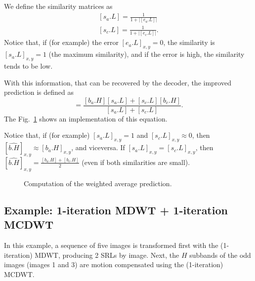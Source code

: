 We define the similarity matrices as
\begin{equation}
  \begin{array}{l}
    {[s_a.L]} = \frac{1}{1+{|[e_a.L]|}}\\
    {[s_c.L]} = \frac{1}{1+{|[e_c.L]|}}.    
  \end{array}
  \label{eq:weighted_prediction}
\end{equation}
Notice that, if (for example) the error $[e_a.L]_{x,y}=0$, the
similarity is $[s_a.L]_{x,y}=1$ (the maximum similarity), and if the
error is high, the similarity tends to be low.

With this information, that can be recovered by the decoder, the
improved prediction is defined as
\begin{equation}
  [\hat{b.H}] = \frac{[b_a.H][s_a.L]+[s_c.L][b_c.H]}{[s_a.L]+[s_c.L]}.
\end{equation}
The Fig.~\ref{fig:weighted_average} shows an implementation of this
equation.

Notice that, if (for example) $[s_a.L]_{x,y}=1$ and
$[s_c.L]_{x,y}\approx 0$, then
$[\hat{b.H}]_{x,y}\approx [b_a.H]_{x,y}$, and viceversa. If
$[s_a.L]_{x,y}=[s_c.L]_{x,y}$, then
$[\hat{b.H}]_{x,y}=\frac{[b_a.H]+[b_c.H]}{2}$ (even if both similarities are small).

\begin{figure}
  \centering 
  \caption{Computation of the weighted average prediction.}
  \label{fig:weighted_average}
\end{figure}

\subsection*{Example: 1-iteration MDWT + 1-iteration MCDWT}
In this example, a sequence of five images is transformed first with
the (1-iteration) MDWT, producing 2 SRLs by image. Next, the $H$
subbands of the odd images (images 1 and 3) are motion compensated
using the (1-iteration) MCDWT.

